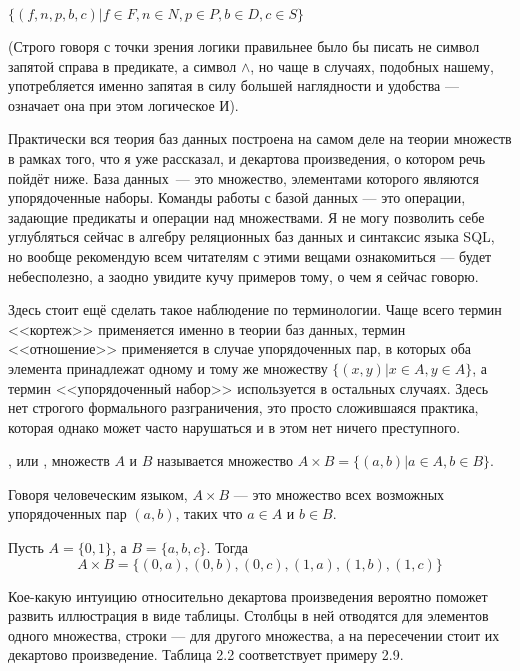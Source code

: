 $\{(f, n, p, b, c)|f\in F, n \in N, p \in P, b \in D, c \in S\}$

(Строго говоря с точки зрения логики правильнее было бы писать не символ запятой справа в предикате, а символ $\wedge$, но чаще в случаях, подобных нашему, употребляется именно запятая в силу большей наглядности и удобства — означает она при этом логическое И).

Практически вся теория баз данных построена на самом деле на теории множеств в рамках того, что я уже рассказал, и декартова произведения, о котором речь пойдёт ниже. База данных~--- это множество, элементами которого являются упорядоченные наборы. Команды работы с базой данных — это операции, задающие предикаты и операции над множествами. Я не могу позволить себе углубляться сейчас в алгебру реляционных баз данных и синтаксис языка SQL, но вообще рекомендую всем читателям с этими вещами ознакомиться — будет небесполезно, а заодно увидите кучу примеров тому, о чем я сейчас говорю.

Здесь стоит ещё сделать такое наблюдение по терминологии. Чаще всего термин <<кортеж>> применяется именно в теории баз данных, термин <<отношение>> применяется в случае упорядоченных пар, в которых оба элемента принадлежат одному и тому же множеству $\{(x, y)|x\in A, y\in A\}$, а термин <<упорядоченный набор>> используется в остальных случаях. Здесь нет строгого формального разграничения, это просто сложившаяся практика, которая однако может часто нарушаться и в этом нет ничего преступного.

\begin{definition}
, или ,  множеств $A$ и $B$ называется множество $A\times B = \{(a, b)|a\in A, b\in B\}$.
\end{definition}

Говоря человеческим языком, $A\times B$ — это множество всех возможных упорядоченных пар $(a, b)$, таких что $a\in A$ и $b \in B$.

\begin{example}
Пусть $A = \{0, 1\}$, а $B = \{a, b, c\}$. Тогда
$$A\times B = \{(0, a), (0, b), (0, c), (1, a), (1, b), (1, c)\}$$
\end{example}

Кое-какую интуицию относительно декартова произведения вероятно поможет развить иллюстрация в виде таблицы. Столбцы в ней отводятся для элементов одного множества, строки — для другого множества, а на пересечении стоит их декартово произведение. Таблица 2.2 соответствует примеру 2.9.

